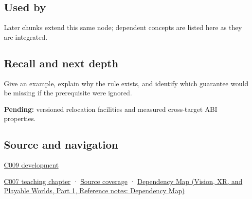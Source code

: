 \subsection{Used by}\label{appendix-958870a64c53-used-by}

\hypertarget{appendix-958870a64c53-used-by}{}

Later chunks extend this same node; dependent concepts are listed here as they are integrated.

\subsection{Recall and next depth}\label{appendix-958870a64c53-recall-and-next-depth}

\hypertarget{appendix-958870a64c53-recall-and-next-depth}{}

Give an example, explain why the rule exists, and identify which guarantee would be missing if the prerequisite were ignored.

\textbf{Pending:} versioned relocation facilities and measured cross-target ABI properties.

\subsection{Source and navigation}\label{appendix-958870a64c53-source-and-navigation}

\hypertarget{appendix-958870a64c53-source-and-navigation}{}

\hyperref[appendix-fd090d982a15-m009---parts-127-147]{C009 development}

\hyperref[01-foundations-i-ch003-bringing-the-object-model-back-to-bytes]{C007 teaching chapter} · \hyperref[appendix-fd090d982a15-m007---parts-101-112]{Source coverage} · \href{../07-Vision-XR-and-Playable-Worlds-P01/main.pdf\#nameddest=appendix-4ad47bdd269a}{Dependency Map (Vision, XR, and Playable Worlds, Part 1, Reference notes: Dependency Map)}

